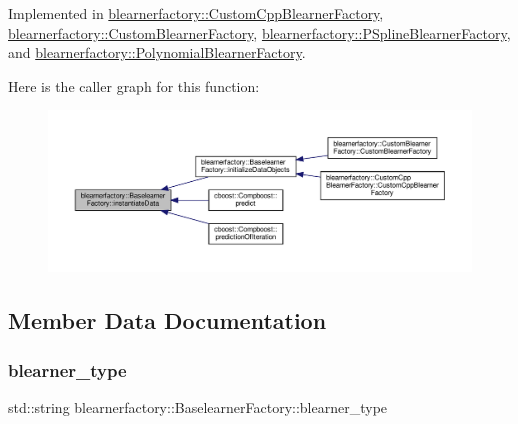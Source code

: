 Implemented in \hyperlink{classblearnerfactory_1_1_custom_cpp_blearner_factory_abc9c251017197087af3ef8a1c0421969}{blearnerfactory\+::\+Custom\+Cpp\+Blearner\+Factory}, \hyperlink{classblearnerfactory_1_1_custom_blearner_factory_aac818f8969820d37ec1a391abbb996da}{blearnerfactory\+::\+Custom\+Blearner\+Factory}, \hyperlink{classblearnerfactory_1_1_p_spline_blearner_factory_a290a1c60224d027059939a895b474aa1}{blearnerfactory\+::\+P\+Spline\+Blearner\+Factory}, and \hyperlink{classblearnerfactory_1_1_polynomial_blearner_factory_aeea9c480671ae7cf7d3be470ce0feaef}{blearnerfactory\+::\+Polynomial\+Blearner\+Factory}.

Here is the caller graph for this function\+:
\nopagebreak
\begin{figure}[H]
\begin{center}
\leavevmode
\includegraphics[width=350pt]{classblearnerfactory_1_1_baselearner_factory_ac4a38c4815fb33b8d4785745117c5e57_icgraph}
\end{center}
\end{figure}


\subsection{Member Data Documentation}
\mbox{\label{classblearnerfactory_1_1_baselearner_factory_a3382b7d9833484f63755a26447a5d2e4}} 
\subsubsection{\texorpdfstring{blearner\+\_\+type}{blearner\_type}}
{\footnotesize\ttfamily std\+::string blearnerfactory\+::\+Baselearner\+Factory\+::blearner\+\_\+type\hspace{0.3cm}{\ttfamily [protected]}}

